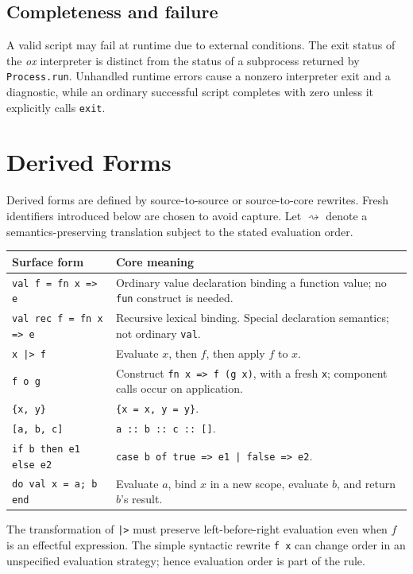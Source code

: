 \documentclass[11pt,oneside,openany]{book}
\newcommand{\ox}{\textit{ox}}
\newcommand{\kw}[1]{\texttt{#1}}
\begin{document}
\section{Completeness and failure}
A valid script may fail at runtime due to external conditions. The exit status of the \ox{} interpreter is distinct from the status of a subprocess returned by \kw{Process.run}. Unhandled runtime errors cause a nonzero interpreter exit and a diagnostic, while an ordinary successful script completes with zero unless it explicitly calls \kw{exit}.

\appendix
\chapter{Derived Forms}
\label{app:derived}
Derived forms are defined by source-to-source or source-to-core rewrites. Fresh identifiers introduced below are chosen to avoid capture. Let $\rightsquigarrow$ denote a semantics-preserving translation subject to the stated evaluation order.

\begin{longtable}{@{}p{}p{}@{}}
\toprule
Surface form & Core meaning \\
\midrule
\endhead
\kw{val f = fn x => e} & Ordinary value declaration binding a function value; no \kw{fun} construct is needed.\\[5pt]
\kw{val rec f = fn x => e} & Recursive lexical binding. Special declaration semantics; not ordinary \kw{val}.\\[5pt]
\kw{x |> f} & Evaluate $x$, then $f$, then apply $f$ to $x$.\\[5pt]
\kw{f o g} & Construct \kw{fn x => f (g x)}, with a fresh \kw{x}; component calls occur on application.\\[5pt]
\kw{\{x, y\}} & \kw{\{x = x, y = y\}}.\\[5pt]
\kw{[a, b, c]} & \kw{a :: b :: c :: []}.\\[5pt]
\kw{if b then e1 else e2} & \kw{case b of true => e1 | false => e2}.\\[5pt]
\kw{do val x = a; b end} & Evaluate $a$, bind $x$ in a new scope, evaluate $b$, and return $b$'s result.\\[5pt]
\bottomrule
\end{longtable}

The transformation of \kw{|>} must preserve left-before-right evaluation even when $f$ is an effectful expression. The simple syntactic rewrite \kw{f x} can change order in an unspecified evaluation strategy; hence evaluation order is part of the rule.
\end{document}
